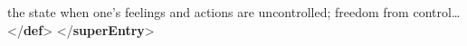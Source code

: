 \begin{shaded}
\hspace*{1em}\mbox{}\newline 
\hspace*{1em}\mbox{}\newline 
\hspace*{1em}\hspace*{1em}the state when one's feelings and actions are uncontrolled; freedom\mbox{}\newline 
\hspace*{1em}\hspace*{1em}\hspace*{1em}\hspace*{1em}\hspace*{1em}\hspace*{1em} from control…{</\textbf{def}>}\mbox{}\newline 
\hspace*{1em}\mbox{}\newline 
{}\mbox{}\newline 
{</\textbf{superEntry}>}\end{shaded}\egroup\par 
